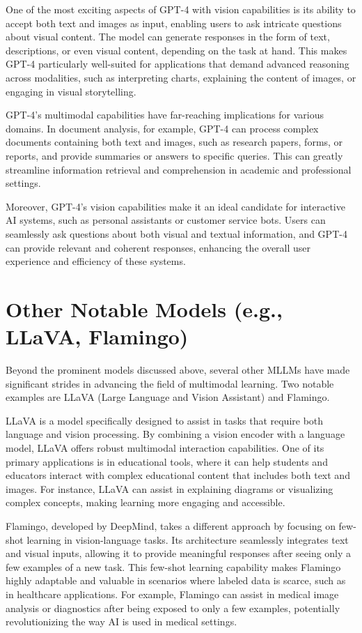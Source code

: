 One of the most exciting aspects of GPT-4 with vision capabilities is its ability to accept both text and images as input, enabling users to ask intricate questions about visual content. The model can generate responses in the form of text, descriptions, or even visual content, depending on the task at hand. This makes GPT-4 particularly well-suited for applications that demand advanced reasoning across modalities, such as interpreting charts, explaining the content of images, or engaging in visual storytelling.

GPT-4's multimodal capabilities have far-reaching implications for various domains. In document analysis, for example, GPT-4 can process complex documents containing both text and images, such as research papers, forms, or reports, and provide summaries or answers to specific queries. This can greatly streamline information retrieval and comprehension in academic and professional settings.

Moreover, GPT-4's vision capabilities make it an ideal candidate for interactive AI systems, such as personal assistants or customer service bots. Users can seamlessly ask questions about both visual and textual information, and GPT-4 can provide relevant and coherent responses, enhancing the overall user experience and efficiency of these systems.

\section{Other Notable Models (e.g., LLaVA, Flamingo)}

Beyond the prominent models discussed above, several other MLLMs have made significant strides in advancing the field of multimodal learning. Two notable examples are LLaVA (Large Language and Vision Assistant) and Flamingo.

LLaVA is a model specifically designed to assist in tasks that require both language and vision processing. By combining a vision encoder with a language model, LLaVA offers robust multimodal interaction capabilities. One of its primary applications is in educational tools, where it can help students and educators interact with complex educational content that includes both text and images. For instance, LLaVA can assist in explaining diagrams or visualizing complex concepts, making learning more engaging and accessible.

Flamingo, developed by DeepMind, takes a different approach by focusing on few-shot learning in vision-language tasks. Its architecture seamlessly integrates text and visual inputs, allowing it to provide meaningful responses after seeing only a few examples of a new task. This few-shot learning capability makes Flamingo highly adaptable and valuable in scenarios where labeled data is scarce, such as in healthcare applications. For example, Flamingo can assist in medical image analysis or diagnostics after being exposed to only a few examples, potentially revolutionizing the way AI is used in medical settings.

